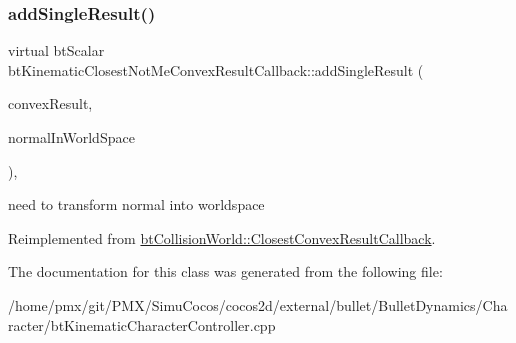 \subsubsection{\texorpdfstring{add\+Single\+Result()}{addSingleResult()}}
{\footnotesize\ttfamily virtual bt\+Scalar bt\+Kinematic\+Closest\+Not\+Me\+Convex\+Result\+Callback\+::add\+Single\+Result (\begin{DoxyParamCaption}\item[{\hyperlink{structbtCollisionWorld_1_1LocalConvexResult}{bt\+Collision\+World\+::\+Local\+Convex\+Result} \&}]{convex\+Result,  }\item[{bool}]{normal\+In\+World\+Space }\end{DoxyParamCaption})\hspace{0.3cm}{\ttfamily [inline]}, {\ttfamily [virtual]}}

need to transform normal into worldspace 

Reimplemented from \hyperlink{structbtCollisionWorld_1_1ClosestConvexResultCallback_a9dee5c09f1bb54f868f34a28353b4505}{bt\+Collision\+World\+::\+Closest\+Convex\+Result\+Callback}.



The documentation for this class was generated from the following file\+:\begin{DoxyCompactItemize}
\item 
/home/pmx/git/\+P\+M\+X/\+Simu\+Cocos/cocos2d/external/bullet/\+Bullet\+Dynamics/\+Character/bt\+Kinematic\+Character\+Controller.\+cpp\end{DoxyCompactItemize}
